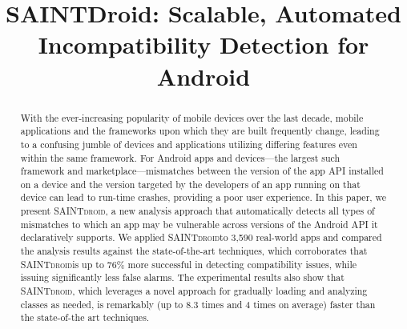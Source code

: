 \documentclass[10pt,journal]{IEEEtran}
\makeatletter
\def \@approach{\textsc{SAINTdroid}}
\makeatother
\begin{document}
\title{SAINTDroid: Scalable, Automated \\Incompatibility Detection for Android} 

\maketitle

\begin{abstract}
With the ever-increasing popularity of mobile devices over
the last decade, mobile applications and the frameworks upon
which they are built frequently change, leading to a
confusing jumble of devices and applications utilizing
differing features even within the same framework. For
Android apps and devices---the largest such framework and
marketplace---mismatches between the version of the app API
installed on a device and the version targeted by the
developers of an app running on that device can lead to
run-time crashes, providing a poor user experience. In this
paper, we present \@approach, a new analysis approach that
automatically detects all types of mismatches to which an
app may be vulnerable across versions of the Android API it
declaratively supports. 
We applied \@approach to 3,590 real-world apps and compared the analysis results against the state-of-the-art techniques,
which corroborates that \@approach is up to 76\% more successful in detecting compatibility issues, while issuing significantly less false alarms.
The experimental results also show that \@approach, which leverages a novel approach for gradually loading and analyzing classes as needed, %
is remarkably (up to 8.3 times and 4 times on average) faster than the state-of-the art techniques.

\end{abstract}

\end{document}
